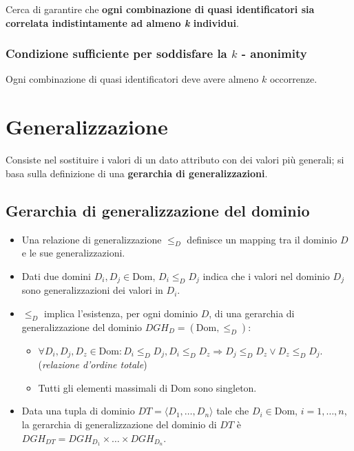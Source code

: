 \documentclass{report}
\begin{document}
Cerca di garantire che \textbf{ogni 
combinazione di quasi identificatori sia correlata indistintamente ad almeno \textit{k} individui}.

\subsubsection{Condizione sufficiente per soddisfare la $k$ - anonimity}
Ogni combinazione di quasi identificatori deve avere almeno $k$ occorrenze.

\section{Generalizzazione}
Consiste nel sostituire i valori di un dato attributo con dei valori più generali;
si basa sulla definizione di una \textbf{gerarchia di generalizzazioni}.

\subsection{Gerarchia di generalizzazione del dominio}
\begin{itemize}
    \item Una relazione di generalizzazione $\leq_D$ definisce un mapping tra il dominio $D$ e le sue generalizzazioni.
    \item Dati due domini $D_i, D_j \in \text{Dom}$, $D_i \leq_D D_j$ indica che i valori nel dominio $D_j$ sono generalizzazioni dei valori in $D_i$.
    \item $\leq_D$ implica l'esistenza, per ogni dominio $D$, di una gerarchia di generalizzazione del dominio $DGH_D = (\text{Dom}, \leq_D)$:
    \begin{itemize}
        \item $\forall D_i, D_j, D_z \in \text{Dom}: D_i \leq_D D_j, D_i \leq_D D_z \Rightarrow D_j \leq_D D_z \lor D_z \leq_D D_j$. (\textit{relazione d'ordine totale})
        \item Tutti gli elementi massimali di $\text{Dom}$ sono singleton.
    \end{itemize}
    \item Data una tupla di dominio $DT = \langle D_1, \ldots, D_n \rangle$ tale che $D_i \in \text{Dom}$, $i = 1, \ldots, n$, la gerarchia di generalizzazione del dominio di $DT$ è $DGH_{DT} = DGH_{D_1} \times \ldots \times DGH_{D_n}$. 
\end{itemize}  
\end{document}

